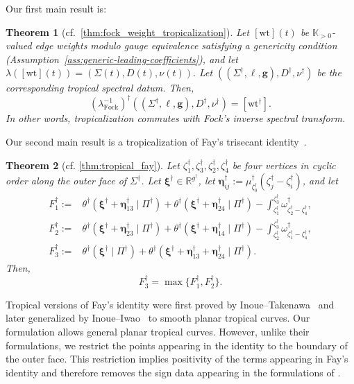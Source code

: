 \documentclass[12pt]{amsart}
\numberwithin{equation}{section}
\newtheorem{theorem}{Theorem}[section]
\theoremstyle{definition}
\newcommand{\R}{\mathbb{R}}
\newcommand{\wt}{\mathrm{wt}}
\def\divisor{D}
\def\Puis{\mathbb K}
\def\Puispos{\Puis_{>0}}
\def\trop{\dagger}
\def\divisor{D}
\def\vecptjac{\bm{\xi}}
\def\ptSig{\zeta}
\def\baseptT{{\ptSig_0^\trop}}
\def\mcurve{\Sigma}
\def\tropmcurve{\mcurve^\trop}
\begin{document}
Our first main result is:


\begin{theorem}[cf.~\cref{thm:fock_weight_tropicalization}]
\label{thm:main}
Let $[\wt](t)$ be $\Puispos$-valued edge weights modulo gauge
equivalence satisfying a genericity condition (Assumption~\ref{ass:generic-leading-coefficients}), and let
$
\lambda([\wt](t))
=
(
\mcurve(t),\divisor(t),\nu(t)
).
$
Let
$
(
(\tropmcurve,\ell,\bm g),
\divisor^\trop,
\nu^\trop
)
$
be the corresponding tropical spectral datum. Then,
\[
(\lambda^{-1}_{\mathrm{Fock}})^\trop
(
(\tropmcurve,\ell,\bm g),
\divisor^\trop,
\nu^\trop
)
=
[\wt^\trop].
\]
In other words, tropicalization commutes with Fock's inverse spectral
transform.
\end{theorem}

Our second main result is a tropicalization of Fay's trisecant identity~\cite{Fay}. 

\begin{theorem}[cf. \cref{thm:tropical_fay}]
Let
$
\ptSig^\trop_1,\ptSig^\trop_3,\ptSig^\trop_2,\ptSig^\trop_4
$
be four vertices in cyclic order along the outer face of $\tropmcurve$. Let $\vecptjac^\trop \in \R^{g^\trop}$, let $\bm \eta_{ij}^\trop
:=\mu_{\baseptT}^{\trop}(\ptSig_j^\trop-\ptSig_i^\trop)$, and let 
\[
\begin{aligned}
F_1^\trop
:={}&
\theta^\trop(
\vecptjac^\trop+\bm \eta_{13}^\trop
\mid
\Pi^{\trop}
)
+
\theta^\trop(
\vecptjac^\trop+\bm \eta_{24}^\trop
\mid
\Pi^{\trop}
)
-
\int_{\ptSig_1^\trop}^{\ptSig_3^\trop}
\omega_{\ptSig_2^\trop-\ptSig_4^\trop}^{\trop},
\\
F_2^\trop
:={}&
\theta^\trop(
\vecptjac^\trop+\bm \eta_{23}^\trop
\mid
\Pi^{\trop}
)
+
\theta^\trop(
\vecptjac^\trop+\bm \eta_{14}^\trop
\mid
\Pi^{\trop}
)
-
\int_{\ptSig_2^\trop}^{\ptSig_3^\trop}
\omega_{\ptSig_1^\trop-\ptSig_4^\trop}^{\trop},
\\
F_3^\trop
:={}&
\theta^\trop(
\vecptjac^\trop
\mid
\Pi^{\trop}
)
+
\theta^\trop(
\vecptjac^\trop
+
\bm \eta_{13}^\trop
+
\bm \eta_{24}^\trop
\mid
\Pi^{\trop}
).
\end{aligned}
\]
Then,
\[
F_3^\trop
=
\max
\{
F_1^\trop,
F_2^\trop
\}.
\]
\end{theorem}

Tropical versions of Fay's identity were first proved by Inoue--Takenawa~\cite{InoueTakenawaFay} and later generalized by Inoue--Iwao~\cite{InoueIwao2011} to smooth planar tropical curves. Our formulation allows general planar tropical curves. However, unlike their formulations, we restrict the points appearing in the identity to the boundary of the outer face. This restriction implies positivity of the terms appearing in Fay's identity and therefore removes the sign data appearing in the formulations of \cite{InoueTakenawaFay,InoueIwao2011}.
\end{document}
